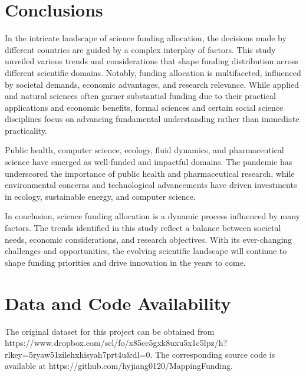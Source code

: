 \section*{Conclusions}
In the intricate landscape of science funding allocation, the decisions made by different countries are guided by a complex interplay of factors. This study unveiled various trends and considerations that shape funding distribution across different scientific domains. Notably, funding allocation is multifaceted, influenced by societal demands, economic advantages, and research relevance. While applied and natural sciences often garner substantial funding due to their practical applications and economic benefits, formal sciences and certain social science disciplines focus on advancing fundamental understanding rather than immediate practicality.

Public health, computer science, ecology, fluid dynamics, and pharmaceutical science have emerged as well-funded and impactful domains. The pandemic has underscored the importance of public health and pharmaceutical research, while environmental concerns and technological advancements have driven investments in ecology, sustainable energy, and computer science.


In conclusion, science funding allocation is a dynamic process influenced by many factors. The trends identified in this study reflect a balance between societal needs, economic considerations, and research objectives. With its ever-changing challenges and opportunities, the evolving scientific landscape will continue to shape funding priorities and drive innovation in the years to come.


\section*{Data and Code Availability}
The original dataset for this project can be obtained from https://www.dropbox.com/scl/fo/x85cc5gxk8uxu5x1c5lpz/h?rlkey=5ryaw51zilehxhisyah7prt4u&dl=0. The corresponding source code is available at https://github.com/hyjiang0120/MappingFunding.

\nolinenumbers